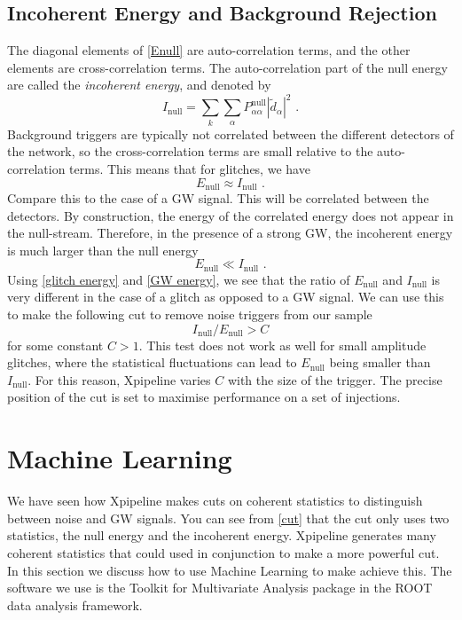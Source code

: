 \documentclass[12pt,twoside,a4paper]{report}
\newcommand{\fs}{\text{ .}}
\begin{document}
\subsection{Incoherent Energy and Background Rejection}
The diagonal elements of \ref{Enull} are auto-correlation terms, and the other elements are cross-correlation terms. The auto-correlation part of the null energy are called the \textit{incoherent energy}, and denoted by
\begin{equation}
I_\text{null} = \sum_k \sum_\alpha P^\text{null}_{\alpha \alpha} | \tilde{d}_\alpha |^2 \fs
\end{equation}
Background triggers are typically not correlated between the different detectors of the network, so the cross-correlation terms are small relative to the auto-correlation terms. This means that for glitches, we have
\begin{equation} \label{glitch energy}
E_\text{null} \approx I_\text{null} \fs
\end{equation} 
Compare this to the case of a GW signal. This will be correlated between the detectors. By construction, the energy of the correlated energy does not appear in the null-stream. Therefore, in the presence of a strong GW, the incoherent energy is much larger than the null energy 
\begin{equation} \label{GW energy}
E_\text{null} \ll I_\text{null} \fs
\end{equation}
Using \ref{glitch energy} and \ref{GW energy}, we see that the ratio of $E_\text{null}$ and $I_\text{null}$ is very different in the case of a glitch as opposed to a GW signal. We can use this to make the following cut to remove noise triggers from our sample
\begin{equation} \label{cut}
I_\text{null} / E_\text{null} > C
\end{equation}
for some constant $C>1$. This test does not work as well for small amplitude glitches, where the statistical fluctuations can lead to $E_\text{null}$ being smaller than $I_\text{null}$. For this reason, Xpipeline varies $C$ with the size of the trigger. The precise position of the cut is set to maximise performance on a set of injections.  

\section{\label{ML}Machine Learning}
We have seen how Xpipeline makes cuts on coherent statistics to distinguish between noise and GW signals. You can see from \ref{cut} that the cut only uses two statistics, the null energy and the incoherent energy. Xpipeline generates many coherent statistics that could used in conjunction to make a more powerful cut. In this section we discuss how to use Machine Learning to make achieve this. The software we use is the Toolkit for Multivariate Analysis package in the ROOT data analysis framework. 
\end{document}
